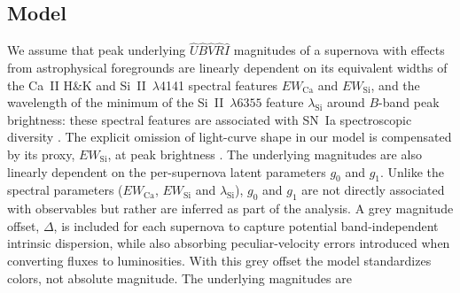 \documentclass[trackchanges]{aastex62}   	%
\begin{document}

\subsection{Model}
We assume 
that  peak
underlying
 ${\hat{U}}{\hat{B}}\hat{V}\hat{R}\hat{I}$ magnitudes of a supernova  with effects from  astrophysical foregrounds are linearly dependent
on its
 equivalent widths of the Ca~II H\&K and Si~II~$\lambda$4141 spectral features
$EW_{\mathrm{Ca}}$ and $EW_{\mathrm{Si}}$,
and the wavelength of the minimum of 
the Si~II~$\lambda6355$ feature $\lambda_{\mathrm{Si}}$
around $B$-band peak brightness:
these spectral features are associated with SN~Ia  spectroscopic diversity  
\citep{2005ApJ...623.1011B, 2006PASP..118..560B, 2008A&A...492..535A, 2009A&A...500L..17B, 2009PASP..121..238B, 2009ApJ...699L.139W, 2011ApJ...729...55F,2012AJ....143..126B}.
The explicit omission of light-curve shape in our model is compensated by its proxy,
$EW_{\mathrm{Si}}$, at peak brightness
\citep{2008A&A...492..535A, 2011A&A...529L...4C}. 
The underlying magnitudes are also linearly dependent on the per-supernova latent parameters $g_0$ and $g_1$.
Unlike
the spectral parameters ($EW_{\mathrm{Ca}}$, $EW_{\mathrm{Si}}$ and $\lambda_{\mathrm{Si}}$),  $g_0$ and $g_1$ are not directly associated
with observables but rather are inferred as part of the analysis.
A grey magnitude offset, $\Delta$, is included for each supernova
to capture 
potential
band-independent intrinsic dispersion, while also absorbing peculiar-velocity errors introduced when converting
fluxes to luminosities.
With this grey offset the model standardizes colors, not absolute magnitude.
The underlying magnitudes are
\end{document}
